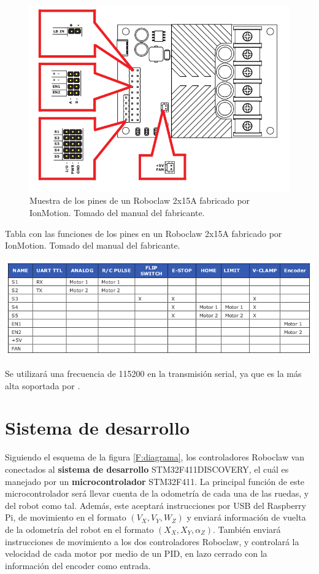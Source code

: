 \begin{figure}[H]
\centering
\includegraphics[scale=0.5]{imagenes/roboclaw.png}
\caption{Muestra de los pines de un Roboclaw 2x15A fabricado por IonMotion. Tomado del manual del fabricante.}
\label{F:roboclaw}
\end{figure}

\begin{table}[H]
\centering
\caption{Tabla con las funciones de los pines en un Roboclaw 2x15A fabricado por IonMotion. Tomado del manual del fabricante.}
\includegraphics[scale=0.7]{imagenes/pines.png}
\label{T:pines}
\end{table}

Se utilizará una frecuencia de 115200 en la transmisión serial, ya que es la más alta soportada por .

\section{Sistema de desarrollo}

Siguiendo el esquema de la figura \ref{F:diagrama}, los controladores Roboclaw van conectados al \textbf{sistema de desarrollo} STM32F411DISCOVERY, el cuál es manejado por un \textbf{microcontrolador} STM32F411. La principal función de este microcontrolador será llevar cuenta de la odometría de cada una de las ruedas, y del robot como tal. Además, este aceptará instrucciones por USB del Raspberry Pi, de movimiento en el formato $(V_X, V_Y, W_Z)$ y enviará información de vuelta de la odometría del robot en el formato $(X_X, X_Y, \alpha_Z)$. También enviará instrucciones de movimiento a los dos controladores Roboclaw, y controlará la velocidad de cada motor por medio de un PID, en lazo cerrado con la información del encoder como entrada.

